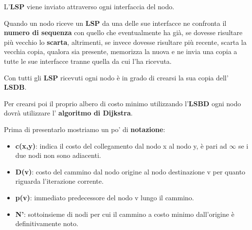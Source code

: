 \documentclass[11pt,a4paper,oneside]{book}
\theoremstyle{definition}
\begin{document}
L'\textbf{LSP} viene inviato attraverso ogni interfaccia del nodo.

Quando un nodo riceve un \textbf{LSP} da una delle sue interfacce ne confronta il \textbf{numero di sequenza} con quello che eventualmente ha già, se dovesse risultare più vecchio lo \textbf{scarta}, altrimenti, se invece dovesse risultare più recente, scarta la vecchia copia, qualora sia presente, memorizza la nuova e ne invia una copia a tutte le sue interfacce tranne quella da cui l'ha ricevuta.

Con tutti gli \textbf{LSP} ricevuti ogni nodo è in grado di crearsi la sua copia dell' \textbf{LSDB}.

Per crearsi poi il proprio albero di costo minimo utilizzando l'\textbf{LSBD} ogni nodo dovrà utilizzare l' \textbf{algoritmo di Dijkstra}.

Prima di presentarlo mostriamo un po' di \textbf{notazione}:
\begin{itemize}
	\item \textbf{c(x,y)}: indica il costo del collegamento dal nodo x al
	      nodo y, è pari ad $\infty$ se i due nodi non sono adiacenti.
	\item \textbf{D(v)}: costo del cammino dal nodo origine al nodo
	      destinazione v per quanto riguarda l’iterazione corrente.
	\item \textbf{p(v)}: immediato predecessore del nodo v lungo il
	      cammino.
	\item \textbf{N'}: sottoinsieme di nodi per cui il cammino a
	      costo minimo dall’origine è definitivamente noto.
\end{itemize}

\pagebreak
\end{document}
